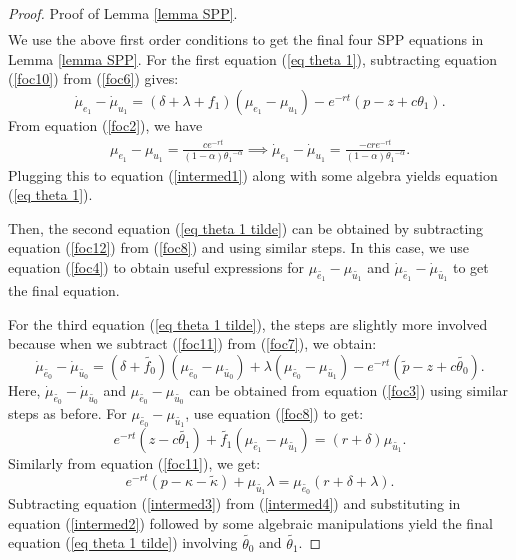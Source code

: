 \documentclass[12pt]{article} %
\theoremstyle{definition}
\begin{document}
\begin{appendix}
\begin{proof}{Proof of Lemma \ref{lemma SPP}.}
\begin{eqnarray}
\end{eqnarray}
We use the above first order conditions to get the final four SPP equations in Lemma \ref{lemma SPP}. For the first equation (\ref{eq theta 1}), subtracting equation (\ref{foc10}) from (\ref{foc6}) gives:
\begin{equation}
   \dot{\mu}_{e_1}-\dot{\mu}_{u_1}=(\delta + \lambda+f_1)(\mu_{e_1}-\mu_{u_1})-e^{-rt}(p-z+c\theta_1). \label{intermed1}
\end{equation}
From equation (\ref{foc2}), we have
\begin{eqnarray*}
 \mu_{e_1}-\mu_{u_1} = \frac{ce^{-rt}}{(1-\alpha){\theta_1}^{-\alpha}} \implies  \dot{\mu}_{e_1}-\dot{\mu}_{u_1} = \frac{-cre^{-rt}}{(1-\alpha){\theta_1}^{-\alpha}}.
\end{eqnarray*}
Plugging this to equation (\ref{intermed1}) along with some algebra yields equation (\ref{eq theta 1}). 

Then, the second equation (\ref{eq theta 1 tilde}) can be obtained by subtracting equation (\ref{foc12}) from (\ref{foc8}) and using similar steps. In this case, we use equation (\ref{foc4}) to obtain useful expressions for $\mu_{\tilde{e_1}}-\mu_{\tilde{u_1}}$ and $\dot{\mu}_{\tilde{e_1}}-\dot{\mu}_{\tilde{u_1}}$ to get the final equation. 

For the third equation (\ref{eq theta 1 tilde}), the steps are slightly more involved because when we subtract (\ref{foc11}) from (\ref{foc7}), we obtain:
\begin{equation}
   \dot{\mu}_{\tilde{e_0}}-\dot{\mu}_{\tilde{u_0}}=(\delta + \tilde{f_0})(\mu_{\tilde{e_0}}-\mu_{\tilde{u_0}}) + \lambda(\mu_{\tilde{e_0}}-\mu_{\tilde{u_1}})-e^{-rt}(\tilde{p}-z+c\tilde{\theta_0}). \label{intermed2}
\end{equation}
Here, $\dot{\mu}_{\tilde{e_0}}-\dot{\mu}_{\tilde{u_0}}$ and $\mu_{\tilde{e_0}}-\mu_{\tilde{u_0}}$ can be obtained from equation (\ref{foc3}) using similar steps as before. For $\mu_{\tilde{e_0}}-\mu_{\tilde{u_1}}$, use equation (\ref{foc8}) to get:
\begin{equation}
    e^{-rt}(z-c\tilde{\theta_1}) + \tilde{f_1}(\mu_{\tilde{e_1}}-\mu_{\tilde{u_1}}) = (r+\delta){\mu}_{\tilde{u_1}}. \label{intermed3}
\end{equation}
Similarly from equation (\ref{foc11}), we get:  
\begin{equation}
    e^{-rt}(p-\kappa-\tilde{\kappa})+\mu_{\tilde{u_1}} \lambda = \mu_{\tilde{e_0}}(r + \delta + \lambda). \label{intermed4}
\end{equation}
Subtracting equation (\ref{intermed3}) from (\ref{intermed4}) and substituting in equation (\ref{intermed2}) followed by some algebraic manipulations yield the final equation (\ref{eq theta 1 tilde}) involving $\tilde{\theta_0}$ and $\tilde{\theta_1}$. 


\end{proof}
\end{appendix}
\end{document}
